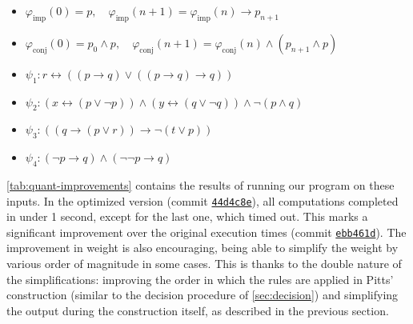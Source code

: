 \documentclass[english,review]{jflart}
\def\BaseUrlCode{https://github.com/hferee/UIML}
\def\CommitOrig{ebb461dd334ce10ceeb00ebaf6094778e2f03c4e} %
\def\CommitOrigShort{ebb461d}
\def\CommitOpt{44d4c8ed2ad8a725c4a5863d470b191063f29db8} %
\def\CommitOptShort{44d4c8e}
\theoremstyle{definition}
\theoremstyle{plain}
\renewcommand{\phi}{\varphi}
\begin{document}
\begin{itemize} \label{def:test-formulas}
	\item $\phi_{\text{imp}}(0) = p, \quad \phi_{\text{imp}}(n+1) = \phi_{\text{imp}}(n) \rightarrow p_{n+1}$
	\item $\phi_{\text{conj}}(0) = p_0 \wedge p, \quad \phi_{\text{conj}}(n+1) = \phi_{\text{conj}}(n) \wedge (p_{n+1} \wedge p)$
	\item $\psi_1: r \leftrightarrow ((p \rightarrow q) \vee ((p \rightarrow q) \rightarrow q))$
	\item $\psi_2: (x \leftrightarrow (p \vee \lnot p)) \wedge (y \leftrightarrow (q \vee \lnot q)) \wedge \lnot (p \wedge q)$
	\item $\psi_3: ((q\rightarrow (p \vee r))\rightarrow \lnot (t \vee p))$
	\item $\psi_4: (\neg p \to q) \wedge (\neg \neg p \to q)$
\end{itemize}



\cref{tab:quant-improvements} contains the results of running our program on these inputs. In the optimized version (commit \href{\BaseUrlCode/tree/\CommitOpt}{\texttt{\CommitOptShort}}), all computations completed in under 1 second, except for the last one, which timed out.
This marks a significant improvement over the original execution times 
(commit \href{\BaseUrlCode/tree/\CommitOrig}{\texttt{\CommitOrigShort}}). 
The improvement in weight is also encouraging, being able to simplify the weight by various order of magnitude in some cases. This is thanks to the double nature of the simplifications: improving the order in which the rules are applied in Pitts' construction (similar to the decision procedure of \cref{sec:decision}) and simplifying the output during the construction itself, as described in the previous section.


 


\end{document}
